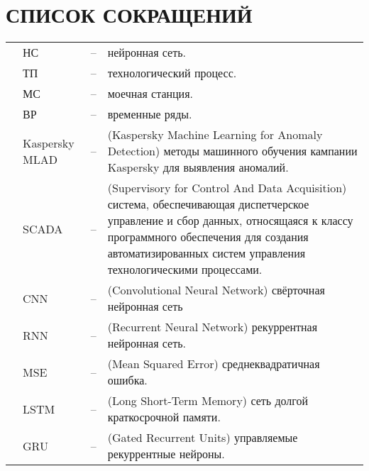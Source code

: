 \sectionbreak \section*{ 
    \gostTitleFont
    \redline
    СПИСОК СОКРАЩЕНИЙ
}
\titlespace

{\gostFont

\begin{tabular}{p{0.85cm} p{1.75cm} p{0.3cm} p{131.5mm}}
	& НС & {--} & нейронная сеть. \\
	& ТП & {--} & технологический процесс.\\ 
	& МС & {--} & моечная станция.\\
	& ВР & {--} & временные ряды.\\
	& Kaspersky MLAD & {--} & (Kaspersky Machine Learning for Anomaly Detection) методы машинного обучения кампании Kaspersky для выявления аномалий. \\
	& SCADA & {--} & (Supervisory for Control And Data Acquisition) система, обеспечивающая диспетчерское управление и сбор данных, относящаяся к классу программного обеспечения для создания автоматизированных систем управления технологическими процессами. \\
	& CNN & {--} & (Convolutional Neural Network) свёрточная нейронная сеть \\
	& RNN & {--} & (Recurrent Neural Network) рекуррентная нейронная сеть. \\
	& MSE & {--} & (Mean Squared Error) среднеквадратичная ошибка. \\
	& LSTM & {--} & (Long Short-Term Memory) сеть долгой краткосрочной памяти. \\
	& GRU & {--} & (Gated Recurrent Units) управляемые рекуррентные нейроны. \\
\end{tabular}
\par 

}

